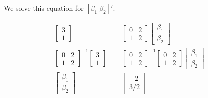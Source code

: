 We solve this equation for $[\beta_1 \; \beta_2]'$.

\begin{align*}
\begin{bmatrix}
 3 \\1
\end{bmatrix}
& =
\begin{bmatrix}
 0 & 2\\
 1 & 2
\end{bmatrix}
\begin{bmatrix}
 \beta_1 \\ \beta_2
\end{bmatrix}\\
%
\begin{bmatrix}
 0 & 2\\
 1 & 2
\end{bmatrix}^{-1}
\begin{bmatrix}
 3 \\1
\end{bmatrix} &=
\begin{bmatrix}
 0 & 2\\
 1 & 2
\end{bmatrix}^{-1}
\begin{bmatrix}
 0 & 2\\
 1 & 2
\end{bmatrix}
\begin{bmatrix}
 \beta_1 \\ \beta_2
\end{bmatrix}\\
%
\begin{bmatrix}
 \beta_1 \\ \beta_2
\end{bmatrix}
 &=
 \begin{bmatrix}
-2 \\
3/2
 \end{bmatrix}
\end{align*}
